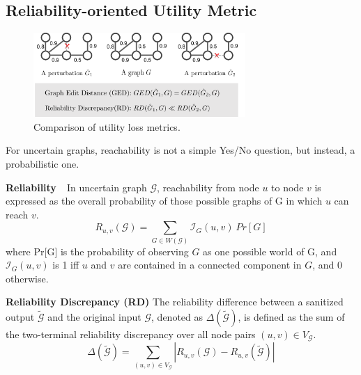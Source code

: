 \subsection{Reliability-oriented Utility Metric}
\begin{figure}[!htb]
  \centering
  \includegraphics[height=3.2cm]{figure/utilityLoss.pdf}
  \vspace{-10pt}
  \caption{Comparison of utility loss metrics.}
  \label{fig:utility_loss}
\end{figure} 
For uncertain graphs, reachability is not a simple Yes/No question, but instead, a probabilistic one. 
\begin{definition}
    \textbf{Reliability~\cite{Colbourn_Colbourn_1987}}~In uncertain graph $\mathcal{G}$, reachability from node $u$ to node $v$ is expressed as the overall probability of those possible graphs of G in which $u$ can reach $v$. 
        \begin{equation*}
                R_{u,v}(\mathcal{G})= \sum_{G \in W(\mathcal{G})} \mathcal{I}_{G}(u,v) ~ Pr[G] 
        \end{equation*}
    where Pr[G] is the probability of observing $G$ as one possible world of G, and $\mathcal{I}_{G}(u,v)$ is 1 iff $u$ and $v$ are contained in a connected component in $G$, and 0 otherwise.   
    \label{d:reliability}
\end{definition}

\theoremstyle{definition}
\begin{definition}
    \textbf{Reliability Discrepancy (RD)}
    The reliability difference between a sanitized output $\tilde{\mathcal{G}}$ and the original input $\mathcal{G}$, 
    denoted as $\Delta(\tilde{\mathcal{G}})$, 
    is defined as the sum of the two-terminal reliability discrepancy over all node pairs $(u,v) \in V_\mathcal{G}$.
    \begin{equation*}
        \Delta(\tilde{\mathcal{G}})=\sum_{(u,v) \in V_\mathcal{G} }|R_{u,v}(\mathcal{G})-R_{u,v}(\tilde{\mathcal{G}})|
    \end{equation*}
    \label{d:RD}
\end{definition}

